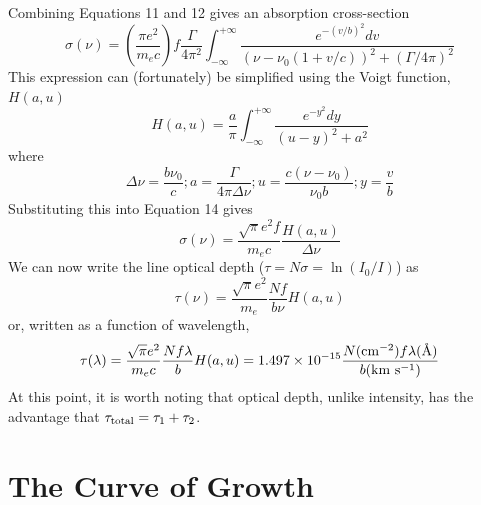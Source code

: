Combining Equations 11 and 12 gives an absorption cross-section
\begin{equation}
	\sigma(\nu) = \left(\frac{\pi e^2}{m_e c}\right)f\frac{\Gamma}{4\pi^2}\int^{+\infty}_{-\infty}\frac{e^{-(v/b)^2}dv}{(\nu - \nu_0(1+v/c))^2 + (\Gamma/4\pi)^2}
\end{equation}
This expression can (fortunately) be simplified using the Voigt function, $H(a,u)$
\begin{equation}
	H(a,u) = \frac{a}{\pi}\int^{+\infty}_{-\infty}\frac{e^{-y^2}dy}{(u-y)^2 + a^2}
\end{equation}
where
\begin{equation}
	\Delta \nu = \frac{b\nu_0}{c}; a = \frac{\Gamma}{4\pi \Delta\nu}; u = \frac{c(\nu-\nu_0)}{\nu_0 b}; y=\frac{v}{b}
\end{equation}
Substituting this into Equation 14 gives
\begin{equation}
	\sigma(\nu) = \frac{\sqrt{\pi} e^2 f}{m_e c}\frac{H(a,u)}{\Delta \nu}
\end{equation}
We can now write the line optical depth ($\tau = N \sigma = \ln(I_0/I)$) as
\begin{equation}
	\tau(\nu) = \frac{\sqrt{\pi}e^2}{m_e}\frac{N f}{b\nu}H(a,u)
\end{equation}
or, written as a function of wavelength,
\begin{equation}
	\tau(\lambda) = \frac{\sqrt{\pi}e^2}{m_e c}\frac{N f \lambda}{b}H(a,u) = 1.497 \times 10^{-15}\frac{N ({\rm cm^{-2}}) f \lambda (\text{\AA})}{b ({\rm km~s^{-1}})}
\end{equation}
At this point, it is worth noting that optical depth, unlike intensity, has the advantage that $\tau_{\rm total} = \tau_1 + \tau_2$.

\section{The Curve of Growth}


